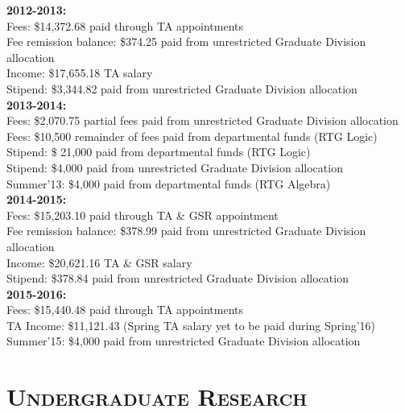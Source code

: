 \documentclass[margin, 10pt]{res} %
\begin{document}
\begin{resume}
\textbf{2012-2013:} \\

Fees: \$14,372.68 paid through TA appointments \\
Fee remission balance: \$374.25 paid from unrestricted Graduate Division allocation  \\
Income: \$17,655.18 TA salary \\
Stipend: \$3,344.82 paid from unrestricted Graduate Division allocation \\				
  
\textbf{2013-2014:} \\

Fees: \$2,070.75 partial fees paid from unrestricted Graduate Division allocation \\
Fees: \$10,500 remainder of fees paid from departmental funds (RTG Logic) \\
Stipend:  \$ 21,000 paid from departmental funds (RTG Logic) \\
Stipend: \$4,000 paid from unrestricted Graduate Division allocation \\
Summer'13: \$4,000 paid from departmental funds (RTG Algebra) \\

\textbf{2014-2015:} \\

Fees: \$15,203.10 paid through TA \& GSR appointment \\
Fee remission balance: \$378.99 paid from unrestricted Graduate Division allocation  \\
Income: \$20,621.16 TA \& GSR salary \\
Stipend: \$378.84 paid from unrestricted Graduate Division allocation \\
  
  
\textbf{2015-2016:} \\

Fees: \$15,440.48 paid through TA appointments \\
TA Income: \$11,121.43 (Spring TA salary yet to be paid during Spring'16) \\
Summer'15: \$4,000 paid from unrestricted Graduate Division allocation \\



 
\section{\textsc{Undergraduate Research}}


\end{resume}
\end{document}
